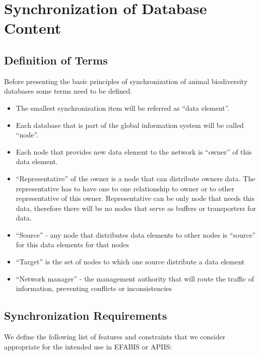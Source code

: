 \chapter{Synchronization of Database Content}

\section{Definition of Terms}

Before presenting the basic principles of synchronization of animal
biodiversity databases some terms need to be defined.

\begin{itemize}
\item The smallest synchronization item will be referred as {}``data element''. 
\item Each database that is part of the global information system will be
called {}``node''.
\item Each node that provides new data element to the network is {}``owner''
of this data element.
\item {}``Representative'' of the owner is a node that can distribute
owners data. The representative has to have one to one relationship
to owner or to other representative of this owner. Representative
can be only node that needs this data, therefore there will be no
nodes that serve as buffers or transporters for data.
\item {}``Source'' - any node that distributes data elements to other
nodes is {}``source'' for this data elements for that nodes
\item {}``Target'' is the set of nodes to which one source distribute
a data element
\item {}``Network manager'' - the management authority that will route
the traffic of information, preventing conflicts or inconsistencies
\end{itemize}

\section{Synchronization Requirements}

We define the following list of features and constraints that we consider
appropriate for the intended use in EFABIS or APIIS:

